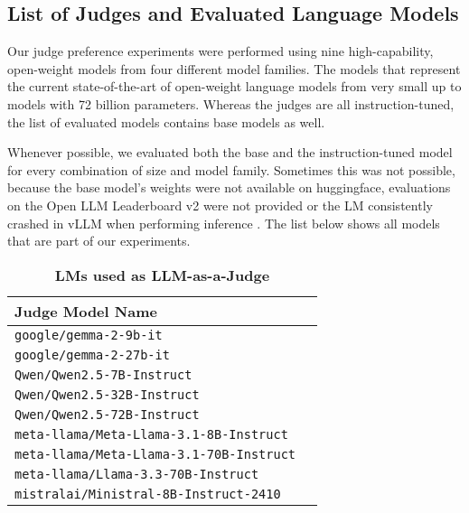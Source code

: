 \subsection{List of Judges and Evaluated Language Models}

Our judge preference experiments were performed using nine high-capability, open-weight models from four different model families. The models that represent the current state-of-the-art of open-weight language models from very small up to models with 72 billion parameters. Whereas the judges are all instruction-tuned, the list of evaluated models contains base models as well.

Whenever possible, we evaluated both the base and the instruction-tuned model for every combination of size and model family. Sometimes this was not possible, because the base model's weights were not available on huggingface, evaluations on the Open LLM Leaderboard v2 were not provided or the LM consistently crashed in vLLM when performing inference \citep{myrzakhan2024openllmleaderboard, kwon2023efficient}. The list below shows all models that are part of our experiments.

\begin{table}[!htbp]
    \centering
    \caption{\textbf{LMs used as LLM-as-a-Judge}}
    \begin{tabular}{ll}
        \hline
        \textbf{Judge Model Name} \\
        \hline
        \texttt{google/gemma-2-9b-it} & \citep{gemmateam2024gemma2improvingopen} \\
        \texttt{google/gemma-2-27b-it} & \citep{gemmateam2024gemma2improvingopen} \\
        \texttt{Qwen/Qwen2.5-7B-Instruct} & \citep{qwen2025qwen25technicalreport} \\
        \texttt{Qwen/Qwen2.5-32B-Instruct} & \citep{qwen2025qwen25technicalreport} \\
        \texttt{Qwen/Qwen2.5-72B-Instruct} & \citep{qwen2025qwen25technicalreport} \\
        \texttt{meta-llama/Meta-Llama-3.1-8B-Instruct} & \citep{grattafiori2024llama3herdmodels} \\
        \texttt{meta-llama/Meta-Llama-3.1-70B-Instruct} & \citep{grattafiori2024llama3herdmodels} \\
        \texttt{meta-llama/Llama-3.3-70B-Instruct} & \citep{meta2024llama33} \\
        \texttt{mistralai/Ministral-8B-Instruct-2410} & \citep{mistral2024ministral8b} \\
        \hline
    \end{tabular}
    \label{tab:judges}
\end{table}

